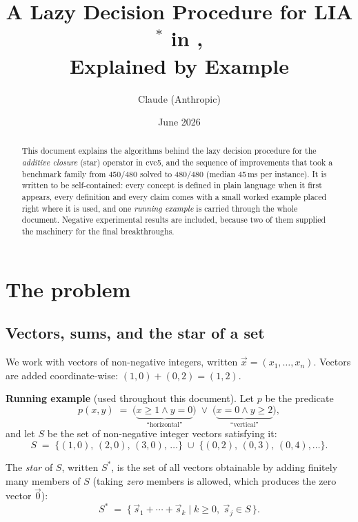 \documentclass[11pt]{article}
\title{A Lazy Decision Procedure for \textsc{LIA}$^{*}$ in \cvc,\\
Explained by Example}
\author{Claude (Anthropic)}
\date{June 2026}
\newcommand{\cvc}{\textsf{cvc5}\xspace}
\newcommand{\Sset}{\ensuremath{S}}
\newcommand{\Sstar}{\ensuremath{S^{*}}}
\newcommand{\vzero}{\ensuremath{\vec{0}}\xspace}
\begin{document}
\maketitle

\begin{abstract}
This document explains the algorithms behind the lazy decision procedure
for the \emph{additive closure} (star) operator in \cvc, and the sequence
of improvements that took a benchmark family from 450/480 solved to
480/480 (median 45\,ms per instance). It is written to be self-contained:
every concept is defined in plain language when it first appears, every
definition and every claim comes with a small worked example placed right
where it is used, and one \emph{running example} is carried through the
whole document. Negative experimental results are included, because two of
them supplied the machinery for the final breakthroughs.
\end{abstract}

\section{The problem}

\subsection{Vectors, sums, and the star of a set}

We work with vectors of non-negative integers, written
$\vec{x} = (x_1,\ldots,x_n)$. Vectors are added coordinate-wise:
$(1,0) + (0,2) = (1,2)$.

\begin{exbox}
\textbf{Running example} (used throughout this document). Let $p$ be the
predicate
\[
p(x,y) \;=\; \big(\underbrace{x \ge 1 \wedge y = 0}_{\text{``horizontal''}}\big)
\;\vee\;
\big(\underbrace{x = 0 \wedge y \ge 2}_{\text{``vertical''}}\big),
\]
and let $\Sset$ be the set of non-negative integer vectors satisfying it:
\[
\Sset \;=\; \{(1,0),\,(2,0),\,(3,0),\,\ldots\} \;\cup\; \{(0,2),\,(0,3),\,(0,4),\ldots\}.
\]
\end{exbox}

The \emph{star} of $\Sset$, written $\Sstar$, is the set of all vectors
obtainable by adding finitely many members of $\Sset$ (taking \emph{zero}
members is allowed, which produces the zero vector $\vzero$):
\[
\Sstar \;=\; \Big\{\, \vec{s}_1 + \cdots + \vec{s}_k \;\Big|\; k \ge 0,\ \vec{s}_j \in \Sset \,\Big\}.
\]
\end{document}
